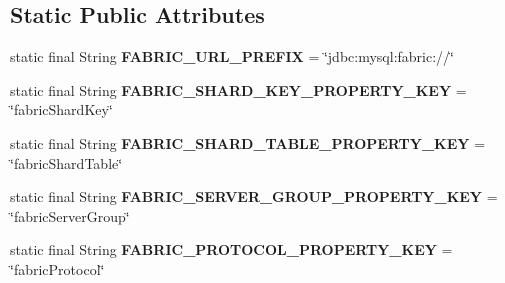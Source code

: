 \subsection*{Static Public Attributes}
\begin{DoxyCompactItemize}
\item 
\mbox{\label{classcom_1_1mysql_1_1fabric_1_1jdbc_1_1_fabric_my_s_q_l_driver_a0c140ad990653dd8afe2c3865edc6e5b}} 
static final String {\bfseries F\+A\+B\+R\+I\+C\+\_\+\+U\+R\+L\+\_\+\+P\+R\+E\+F\+IX} = \char`\"{}jdbc\+:mysql\+:fabric\+://\char`\"{}
\item 
\mbox{\label{classcom_1_1mysql_1_1fabric_1_1jdbc_1_1_fabric_my_s_q_l_driver_a42768056730e2df3c721152e416b8381}} 
static final String {\bfseries F\+A\+B\+R\+I\+C\+\_\+\+S\+H\+A\+R\+D\+\_\+\+K\+E\+Y\+\_\+\+P\+R\+O\+P\+E\+R\+T\+Y\+\_\+\+K\+EY} = \char`\"{}fabric\+Shard\+Key\char`\"{}
\item 
\mbox{\label{classcom_1_1mysql_1_1fabric_1_1jdbc_1_1_fabric_my_s_q_l_driver_a7491babe75641422f4b3ac0a969624d7}} 
static final String {\bfseries F\+A\+B\+R\+I\+C\+\_\+\+S\+H\+A\+R\+D\+\_\+\+T\+A\+B\+L\+E\+\_\+\+P\+R\+O\+P\+E\+R\+T\+Y\+\_\+\+K\+EY} = \char`\"{}fabric\+Shard\+Table\char`\"{}
\item 
\mbox{\label{classcom_1_1mysql_1_1fabric_1_1jdbc_1_1_fabric_my_s_q_l_driver_a7b4d911a8b5bf7ad35e7420b34bacc3c}} 
static final String {\bfseries F\+A\+B\+R\+I\+C\+\_\+\+S\+E\+R\+V\+E\+R\+\_\+\+G\+R\+O\+U\+P\+\_\+\+P\+R\+O\+P\+E\+R\+T\+Y\+\_\+\+K\+EY} = \char`\"{}fabric\+Server\+Group\char`\"{}
\item 
\mbox{\label{classcom_1_1mysql_1_1fabric_1_1jdbc_1_1_fabric_my_s_q_l_driver_aeb323970e4c82e4f2db158400098b5af}} 
static final String {\bfseries F\+A\+B\+R\+I\+C\+\_\+\+P\+R\+O\+T\+O\+C\+O\+L\+\_\+\+P\+R\+O\+P\+E\+R\+T\+Y\+\_\+\+K\+EY} = \char`\"{}fabric\+Protocol\char`\"{}
\item 
\mbox{\label{classcom_1_1mysql_1_1fabric_1_1jdbc_1_1_fabric_my_s_q_l_driver_a437f50b4bd4151b1252cc5b1b26963e0}} 

\end{DoxyCompactItemize}
